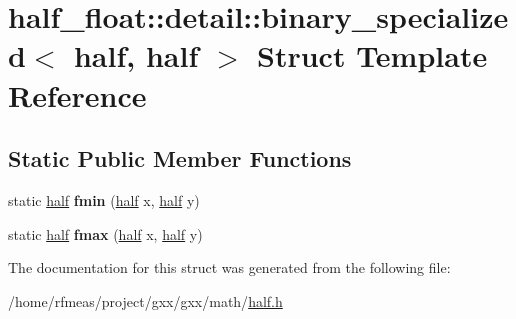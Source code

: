 \hypertarget{structhalf__float_1_1detail_1_1binary__specialized_3_01half_00_01half_01_4}{}\section{half\+\_\+float\+:\+:detail\+:\+:binary\+\_\+specialized$<$ half, half $>$ Struct Template Reference}
\label{structhalf__float_1_1detail_1_1binary__specialized_3_01half_00_01half_01_4}
\subsection*{Static Public Member Functions}
\begin{DoxyCompactItemize}
\item 
static \hyperlink{classhalf__float_1_1half}{half} {\bfseries fmin} (\hyperlink{classhalf__float_1_1half}{half} x, \hyperlink{classhalf__float_1_1half}{half} y)\hypertarget{structhalf__float_1_1detail_1_1binary__specialized_3_01half_00_01half_01_4_a26cf067eeb5a5a7b20d0da1ddade32ad}{}\label{structhalf__float_1_1detail_1_1binary__specialized_3_01half_00_01half_01_4_a26cf067eeb5a5a7b20d0da1ddade32ad}

\item 
static \hyperlink{classhalf__float_1_1half}{half} {\bfseries fmax} (\hyperlink{classhalf__float_1_1half}{half} x, \hyperlink{classhalf__float_1_1half}{half} y)\hypertarget{structhalf__float_1_1detail_1_1binary__specialized_3_01half_00_01half_01_4_a906748ac07462c30c52cfe7145ae307c}{}\label{structhalf__float_1_1detail_1_1binary__specialized_3_01half_00_01half_01_4_a906748ac07462c30c52cfe7145ae307c}

\end{DoxyCompactItemize}


The documentation for this struct was generated from the following file\+:\begin{DoxyCompactItemize}
\item 
/home/rfmeas/project/gxx/gxx/math/\hyperlink{half_8h}{half.\+h}\end{DoxyCompactItemize}
